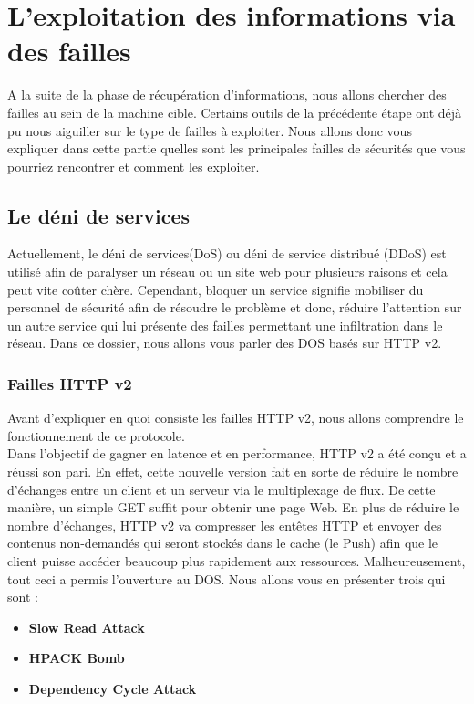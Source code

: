 \chapter{L'exploitation des informations via des failles}

A la suite de la phase de récupération d'informations, nous allons chercher des failles au sein de la machine cible. Certains outils de la précédente étape ont déjà pu nous aiguiller sur le type de failles à exploiter. Nous allons donc vous expliquer dans cette partie quelles sont les principales failles de sécurités que vous pourriez rencontrer et comment les exploiter.

\section{Le déni de services}

Actuellement, le déni de services(DoS) ou  déni de service distribué (DDoS) est utilisé afin de paralyser un réseau ou un site web pour plusieurs raisons et cela peut vite coûter chère. Cependant, bloquer un service signifie mobiliser du personnel de sécurité afin de résoudre le problème et donc, réduire l'attention sur un autre service qui lui présente des failles permettant une infiltration dans le réseau. Dans ce dossier, nous allons vous parler des DOS basés sur HTTP v2.

\subsection{Failles HTTP v2}

Avant d'expliquer en quoi consiste les failles HTTP v2, nous allons comprendre le fonctionnement de ce protocole.\\
Dans l'objectif de gagner en latence et en performance, HTTP v2 a été conçu et a réussi son pari. En effet, cette nouvelle version fait en sorte de réduire le nombre d'échanges entre un client et un serveur via le multiplexage de flux. De cette manière, un simple GET suffit pour obtenir une page Web. En plus de réduire le nombre d'échanges, HTTP v2 va compresser les entêtes HTTP et envoyer des contenus non-demandés qui seront stockés dans le cache (le Push) afin que le client puisse accéder beaucoup plus rapidement aux ressources. Malheureusement, tout ceci a permis l'ouverture au DOS. Nous allons vous en présenter trois qui sont :

\begin{itemize}
    \item \textbf{Slow Read Attack}
    \item \textbf{HPACK Bomb}
    \item \textbf{Dependency Cycle Attack}
\end{itemize}

